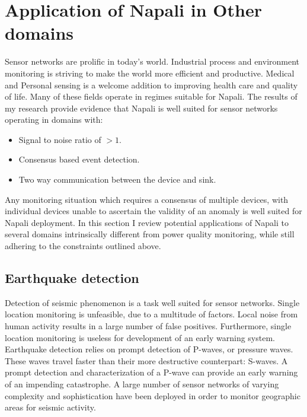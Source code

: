 \section{Application of Napali in Other domains}\label{sec:application-of-napali-in-other-domains}
Sensor networks are prolific in today's world.
Industrial process and environment monitoring is striving to make the world more efficient and productive.
Medical and Personal sensing is a welcome addition to improving health care and quality of life.
Many of these fields operate in regimes suitable for Napali.
The results of my research provide evidence that Napali is well suited for sensor networks operating in domains with:
\begin{itemize}
    \item Signal to noise ratio of $>1$.
    \item Consensus based event detection.
    \item Two way communication between the device and sink.
\end{itemize}
Any monitoring situation which requires a consensus of multiple devices, with individual devices unable to ascertain the validity of an anomaly is well suited for Napali deployment.
In this section I review potential applications of Napali to several domains intrinsically different from power quality monitoring, while still adhering to the constraints outlined above.

\subsection{Earthquake detection}
Detection of seismic phenomenon is a task well suited for sensor networks.
Single location monitoring is unfeasible, due to a multitude of factors.
Local noise from human activity results in a large number of false positives.
Furthermore, single location monitoring is useless for development of an early warning system.
Earthquake detection relies on prompt detection of P-waves, or pressure waves.
These waves travel faster than their more destructive counterpart: S-waves.
A prompt detection and characterization of a P-wave can provide an early warning of an impending catastrophe.
A large number of sensor networks of varying complexity and sophistication have been deployed in order to monitor geographic areas for seismic activity.\cite{burkett2014shakealert}\cite{zaicenco2012lessons}\cite{klapez2018first}\cite{finazzi2017statistical}

